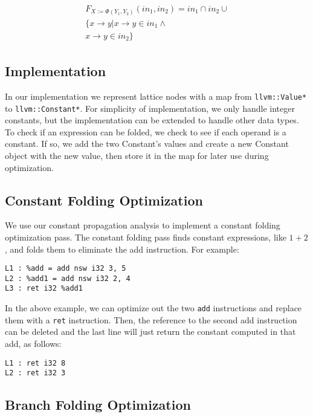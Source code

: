 \begin{align} 
	\begin{split}
		F_{X := \Phi(Y_1, Y_2)}(in_1, in_2) = in_1 \cap in_2  \cup \\
		\{x \to y | x \to y \in in_1 \wedge \\
		 x \to y \in in_2\}
	\end{split}
\end{align}

\subsection{Implementation}

In our implementation we represent lattice nodes with a map from \texttt{llvm::Value*} to \texttt{llvm::Constant*}. For simplicity of implementation, we only handle integer constants, but the implementation can be extended to handle other data types. \\

To check if an expression can be folded, we check to see if each operand is a constant. If so, we add the two Constant's values and create a new Constant object with the new value, then store it in the map for later use during optimization. 

\subsection{Constant Folding Optimization}

We use our constant propagation analysis to implement a constant folding optimization pass. The constant folding pass finds constant expressions, like $1+2$, and folds them to eliminate the add instruction. For example:

\begin{verbatim}
L1 : %add = add nsw i32 3, 5
L2 : %add1 = add nsw i32 2, 4
L3 : ret i32 %add1
\end{verbatim}

In the above example, we can optimize out the two \texttt{add} instructions and replace them with a \texttt{ret} instruction. Then, the reference to the second add instruction can be deleted and the last line will just return the constant computed in that add, as follows:

\begin{verbatim}
L1 : ret i32 8
L2 : ret i32 3
\end{verbatim}

\subsection{Branch Folding Optimization}

